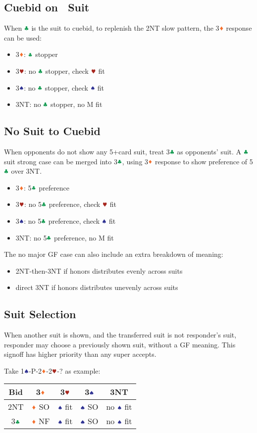 \documentclass{article}
\begin{document}
\begin{multicols}{2}
\begin{CJK*}{UTF8}{gt}
\subsection{Cuebid on \CCC\ Suit}
When $\ccc$ is the suit to cuebid, to replenish the 2NT slow pattern, the 3$\ddd$ response can be used:
\begin{itemize}
    \item 3$\ddd$: $\ccc$ stopper
    \item 3$\hhh$: no $\ccc$ stopper, check $\hhh$ fit
    \item 3$\sss$: no $\ccc$ stopper, check $\sss$ fit
    \item 3NT: no $\ccc$ stopper, no M fit
\end{itemize}

\subsection{No Suit to Cuebid}
When opponents do not show any 5+card suit, treat 3$\ccc$ as opponents' suit. A $\ccc$ suit strong case can be merged into 3$\ccc$, using 3$\ddd$ response to show preference of 5$\ccc$ over 3NT.
\begin{itemize}
    \item 3$\ddd$: 5$\ccc$ preference
    \item 3$\hhh$: no 5$\ccc$ preference, check $\hhh$ fit
    \item 3$\sss$: no 5$\ccc$ preference, check $\sss$ fit
    \item 3NT: no 5$\ccc$ preference, no M fit
\end{itemize}

\noindent The no major GF case can also include an extra breakdown of meaning:
\begin{itemize}
    \item 2NT-then-3NT if honors distributes evenly across suits
    \item direct 3NT if honors distributes unevenly across suits
\end{itemize}

\subsection{Suit Selection}
When another suit is shown, and the transferred suit is not responder's suit, responder may choose a previously shown suit, without a GF meaning. This signoff has higher priority than any super accepts.

\noindent Take 1$\sss$-P-2$\ddd$-2$\hhh$-? as example: \\
\begin{tabular}{c|c|c|c|c}
    \hline
    Bid & 3$\ddd$ & 3$\hhh$ & 3$\sss$ & 3NT \\ \hline\hline
    2NT & $\ddd$ SO & $\sss$ fit & $\sss$ SO & no $\sss$ fit \\ \hline
    3$\ccc$ & $\ddd$ NF & $\sss$ fit & $\sss$ SO & no $\sss$ fit \\ \hline
\end{tabular}


\end{CJK*}
\end{multicols}
\end{document}
